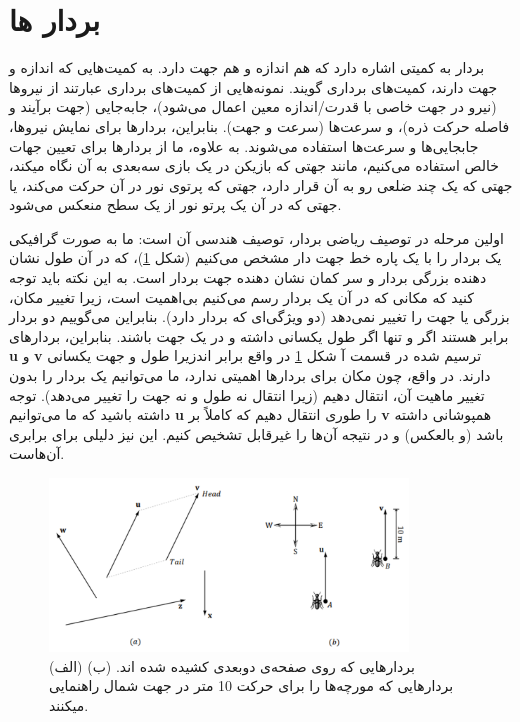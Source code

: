 \section{\textbf{بردار ها}}
\label{sec:1.1}
{
    \Large
    \begin{spacing}{1.4}
        بردار به کمیتی اشاره دارد که هم اندازه و هم جهت دارد.
        به کمیت‌هایی که اندازه و جهت دارند، کمیت‌های برداری گویند.
        نمونه‌هایی از کمیت‌های برداری عبارتند از نیروها (نیرو در جهت خاصی با قدرت/اندازه معین اعمال می‌شود)، جابه‌جایی (جهت برآیند و فاصله حرکت ذره)، و سرعت‌ها (سرعت و جهت).
        بنابراین، بردارها برای نمایش نیروها، جابجایی‌ها و سرعت‌ها استفاده می‌شوند.
        به علاوه، ما از بردارها برای تعیین جهات خالص استفاده می‌کنیم،
        مانند جهتی که بازیکن در یک بازی سه‌بعدی به آن نگاه میکند،
        جهتی که یک چند ضلعی رو به آن قرار دارد، جهتی که پرتوی نور در آن حرکت می‌کند،
        یا جهتی که در آن یک پرتو نور از یک سطح منعکس می‌شود.

        اولین مرحله در توصیف ریاضی بردار، توصیف هندسی آن است: ما به صورت گرافیکی یک بردار را با یک پاره خط جهت دار مشخص می‌کنیم (شکل \ref{fig:4.Session.1.1.1})، که در آن طول نشان دهنده بزرگی بردار و سر کمان نشان دهنده جهت بردار است.
        به این نکته باید توجه کنید که مکانی که در آن یک بردار رسم می‌کنیم بی‌اهمیت است، زیرا تغییر مکان، بزرگی یا جهت را تغییر نمی‌دهد (دو ویژگی‌ای که بردار دارد).
        بنابراین می‌گوییم دو بردار برابر هستند اگر و تنها اگر طول یکسانی داشته و در یک جهت باشند.
        بنابراین، بردارهای \textbf{u} و \textbf{v} ترسیم شده در قسمت آ شکل \ref{fig:4.Session.1.1.1} در واقع برابر اند‌زیرا طول و جهت یکسانی دارند.
        در واقع، چون مکان برای بردارها اهمیتی ندارد، ما می‌توانیم یک بردار را بدون تغییر ماهیت آن، انتقال دهیم (زیرا انتقال نه طول و نه جهت را تغییر می‌دهد).
        توجه داشته باشید که ما می‌توانیم \textbf{u} را طوری انتقال دهیم که کاملاً بر \textbf{v} همپوشانی داشته باشد (و بالعکس) و در نتیجه آن‌ها را غیرقابل تشخیص کنیم. این نیز دلیلی برای برابری آن‌هاست.

        \begin{figure}[H]
            \centering
            \setlength{\belowcaptionskip}{-10pt}
            \includegraphics[width=0.85\textwidth]{Images/4/1/4.Session.1.1.1}
            \caption{(الف) بردار‌هایی که روی صفحه‌ی دوبعدی کشیده شده اند.
                (ب) بردار‌هایی که مورچه‌ها را برای حرکت 10 متر در جهت شمال راهنمایی میکنند.}
            \label{fig:4.Session.1.1.1}
        \end{figure}


\end{spacing}}

